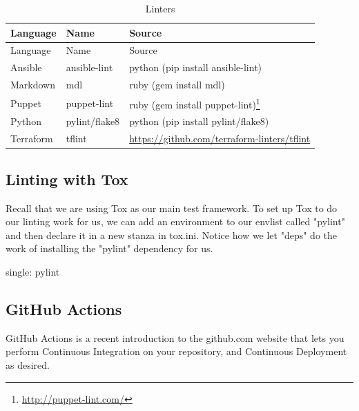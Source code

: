 \begin{longtable}[]{@{}lll@{}}
\caption{Linters}\tabularnewline
\toprule
Language & Name & Source\tabularnewline
\midrule
\endfirsthead
\toprule
Language & Name & Source\tabularnewline
\midrule
\endhead
Ansible & ansible-lint & python (pip install
ansible-lint)\tabularnewline
Markdown & mdl & ruby (gem install mdl)\tabularnewline
Puppet & puppet-lint & ruby (gem install puppet-lint)\footnote{\url{http://puppet-lint.com/}}\tabularnewline
Python & pylint/flake8 & python (pip install
pylint/flake8)\tabularnewline
Terraform & tflint &
\url{https://github.com/terraform-linters/tflint}\tabularnewline
\bottomrule
\end{longtable}

\hypertarget{linting-with-tox}{%
\subsection{Linting with Tox}\label{linting-with-tox}}

Recall that we are using Tox as our main test framework. To set up Tox
to do our linting work for us, we can add an environment to our envlist
called "pylint" and then declare it in a new stanza in tox.ini. Notice
how we let "deps" do the work of installing the "pylint" dependency for
us.

single: pylint

\begin{Shaded}
\begin{Highlighting}[]
\NormalTok{[tox]}
\OperatorTok{=}
\OperatorTok{=}

\NormalTok{[pylint]}
\OperatorTok{=}
\OperatorTok{=}
\OperatorTok{-}\OperatorTok{--}\OperatorTok{=}\OperatorTok{/}
\end{Highlighting}
\end{Shaded}

\hypertarget{github-actions}{%
\subsection{GitHub Actions}\label{github-actions}}

GitHub Actions is a recent introduction to the github.com website that
lets you perform Continuous Integration on your repository, and
Continuous Deployment as desired.

